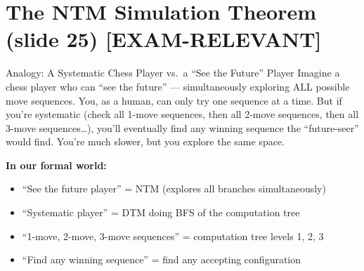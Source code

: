 \documentclass[11pt,a4paper]{article}
\newcommand{\kemark}{\textcolor{red!70!black}{\textbf{[EXAM-RELEVANT]}}}
\begin{document}
\newpage
\section{The NTM Simulation Theorem (slide 25) \kemark}

\begin{notebox}{Analogy: A Systematic Chess Player vs.\ a ``See the Future'' Player}
Imagine a chess player who can ``see the future'' --- simultaneously exploring ALL possible move sequences. You, as a human, can only try one sequence at a time. But if you're systematic (check all 1-move sequences, then all 2-move sequences, then all 3-move sequences\ldots), you'll eventually find any winning sequence the ``future-seer'' would find. You're much slower, but you explore the same space.

\textbf{In our formal world:}
\begin{itemize}[nosep]
\item ``See the future player'' = NTM (explores all branches simultaneously)
\item ``Systematic player'' = DTM doing BFS of the computation tree
\item ``1-move, 2-move, 3-move sequences'' = computation tree levels 1, 2, 3
\item ``Find any winning sequence'' = find any accepting configuration
\end{itemize}
\end{notebox}
\end{document}
